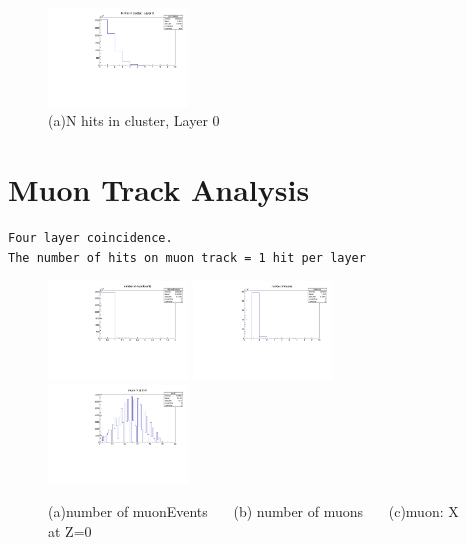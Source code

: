 \documentclass[a4paper,11pt]{article}
\theoremstyle{mytheor}
\begin{document}
\begin{figure}[H] 
\vspace*{-0.3cm} 
\includegraphics[width=0.33\textwidth,scale=0.5,trim=0 0 0 0,clip]{plotsdir/file0_clusters-hcL3nHits-1.pdf} 
\caption{(a)N hits in cluster, Layer 0 } 
\end{figure} 
\newpage 
\section{Muon Track Analysis} 
\begin{verbatim} 
Four layer coincidence. 
The number of hits on muon track = 1 hit per layer  
\end{verbatim} 
\begin{figure}[H] 
\vspace*{-0.3cm} 
\includegraphics[width=0.33\textwidth,scale=0.5,trim=0 0 0 0,clip]{plotsdir/file0_muons-nMuonEvents-1.pdf} 
\includegraphics[width=0.33\textwidth,scale=0.5,trim=0 0 0 0,clip]{plotsdir/file0_muons-nMuons-1.pdf} 
\includegraphics[width=0.33\textwidth,scale=0.5,trim=0 0 0 0,clip]{plotsdir/file0_muons-muX-1.pdf} 
\caption{(a)number of muonEvents ~~~(b) number of muons ~~~(c)muon: X at Z=0 } 
\end{figure} 
\end{document}
